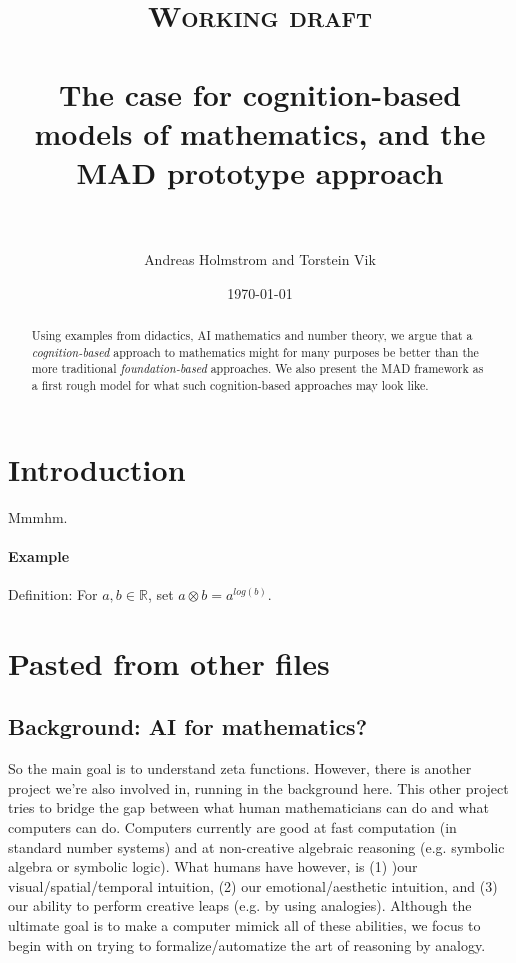 \documentclass[paper=a4, fontsize=11pt]{scrartcl} %
\title{
\normalfont \normalsize
\textsc{Working draft} \\ [25pt] %
\horrule{0.5pt} \\[0.4cm] %
\huge The case for cognition-based models of mathematics, and the MAD prototype approach \\ %
\horrule{2pt} \\[0.5cm] %
}
\author{Andreas Holmstrom and Torstein Vik} %
\date{\normalsize\today} %
\numberwithin{equation}{section} %
\numberwithin{figure}{section} %
\numberwithin{table}{section} %
\begin{document}
\maketitle %



\begin{abstract}
Using examples from didactics, AI mathematics and number theory, we argue that a \emph{cognition-based} approach to mathematics might for many purposes be better than the more traditional \emph{foundation-based} approaches. We also present the MAD framework as a first rough model for what such cognition-based approaches may look like.
\end{abstract}

\section{Introduction}

Mmmhm.

\paragraph{Example}
Definition: For $a, b \in \mathbb{R}$, set $a \otimes b = a^{log(b)}$.


\section{Pasted from other files}

\subsection{Background: AI for mathematics?}

So the main goal is to understand zeta functions. However, there is another project we're also involved in, running in the background here. This other project tries to bridge the gap between what human mathematicians can do and what computers can do. Computers currently are good at fast computation (in standard number systems) and at non-creative algebraic reasoning (e.g. symbolic algebra or symbolic logic). What humans have however, is (1) )our visual/spatial/temporal intuition, (2) our emotional/aesthetic intuition, and (3) our ability to perform creative leaps (e.g. by using analogies). Although the ultimate goal is to make a computer mimick all of these abilities, we focus to begin with on trying to formalize/automatize the art of reasoning by analogy.
\end{document}
